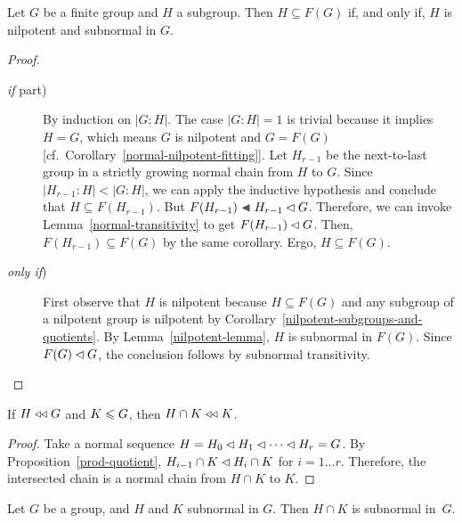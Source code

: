\begin{thm}\label{nilpotent-and-subnormal}
    Let\/ $G$ be a finite group and\/ $H$ a subgroup. Then $H\subseteq F(G)$ if, and only if, $H$ is nilpotent and subnormal in\/ $G$.
\end{thm}

\begin{proof}\ 

\begin{description}
    \item[\normalfont\textit{if\/} part)] By induction on $|G:H|$. The case $|G:H|=1$ is trivial because it implies $H=G$, which means\/ $G$ is nilpotent and\/ $G=F(G)$ [cf.~Corollary~\ref{normal-nilpotent-fitting}]. Let $H_{r-1}$ be the next-to-last group in a strictly growing normal chain from $H$ to $G$. Since $|H_{r-1}:H|< |G:H|$, we can apply the inductive hypothesis and conclude that $H\subseteq F(H_{r-1})$. But $F(H_{r-1})\ch H_{r-1}\normal G$. Therefore, we can invoke Lemma~\ref{normal-transitivity} to get $F(H_{r-1})\lhd G$. Then, $F(H_{r-1})\subseteq F(G)$ by the same corollary. Ergo, $H\subseteq F(G)$.

    \item[\normalfont\textit{only if\/})] First observe that $H$ is nilpotent because $H\subseteq F(G)$ and any subgroup of a nilpotent group is nilpotent by Corollary~\ref{nilpotent-subgroups-and-quotients}. By Lemma~\ref{nilpotent-lemma}, $H$ is subnormal in $F(G)$. Since $F(G)\lhd G$, the conclusion follows by subnormal transitivity.
\end{description}
\end{proof}

\begin{lem}\label{subnormal-restriction}
     If\/ $H \mathrel{\triangleleft\triangleleft} G$ and $K \leqslant G$, then $H\cap K \mathrel{\triangleleft\triangleleft} K$.
\end{lem}

\begin{proof} Take a normal sequence $H=H_0\lhd H_1\lhd\cdots\lhd H_r=G$. By Proposition~\ref{prod-quotient}, $H_{i-1}\cap K\lhd H_i\cap K$ for $i=1\dots r$. Therefore, the intersected chain is a normal chain from $H\cap K$ to $K$.  \end{proof}

\begin{prop}
    Let\/ $G$ be a group, and\/ $H$ and\/ $K$ subnormal in\/ $G$. Then $H\cap K$ is subnormal in\/~$G$.
\end{prop}


